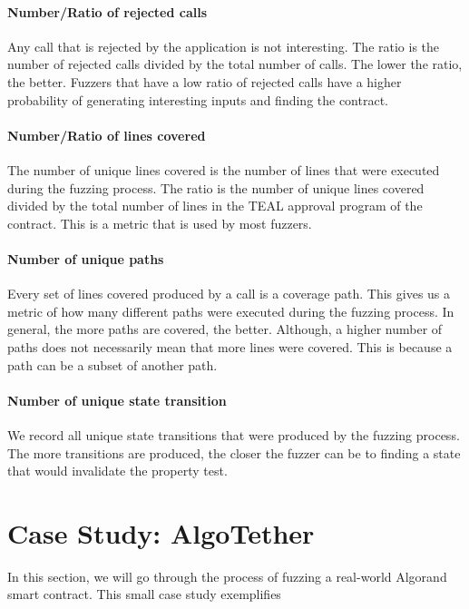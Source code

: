 \paragraph{Number/Ratio of rejected calls} Any call that is rejected by the application is not interesting.
The ratio is the number of rejected calls divided by the total number of calls.
The lower the ratio, the better.
Fuzzers that have a low ratio of rejected calls have a higher probability of generating interesting inputs and finding the contract.

\paragraph{Number/Ratio of lines covered} The number of unique lines covered is the number of lines that were executed during the fuzzing process.
The ratio is the number of unique lines covered divided by the total number of lines in the \ac{TEAL} approval program of the contract.
This is a metric that is used by most fuzzers.

\paragraph{Number of unique paths} Every set of lines covered produced by a call is a coverage path.
This gives us a metric of how many different paths were executed during the fuzzing process.
In general, the more paths are covered, the better.
Although, a higher number of paths does not necessarily mean that more lines were covered.
This is because a path can be a subset of another path.

\paragraph{Number of unique state transition} We record all unique state transitions that were produced by the fuzzing process.
The more transitions are produced, the closer the fuzzer can be to finding a state that would invalidate the property test.

\section{Case Study: AlgoTether}
In this section, we will go through the process of fuzzing a real-world Algorand smart contract.
This small case study exemplifies
